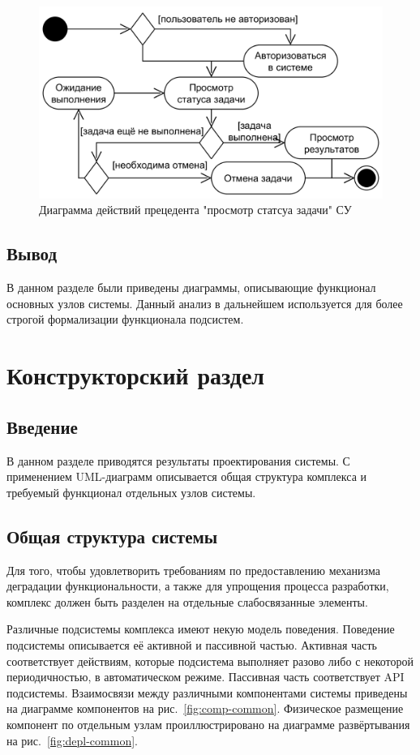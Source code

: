 \documentclass[a4paper,12pt]{report}
\numberwithin{equation}{section}
\begin{document}
\begin{figure}
  \centering
  \includegraphics[width=\linewidth]{diagrams/logic/activity-view}
  \caption{Диаграмма действий прецедента "просмотр статсуа задачи" СУ}
  \label{fig:logic-view}
\end{figure}

\subsection{Вывод}
В данном разделе были приведены диаграммы, описывающие функционал основных узлов системы.
Данный анализ в дальнейшем используется для более строгой формализации функционала подсистем.

\clearpage
\section{Конструкторский раздел}
\subsection{Введение}
В данном разделе приводятся результаты проектирования системы.
С применением UML-диаграмм описывается общая структура комплекса и требуемый функционал отдельных узлов системы.

\subsection{Общая структура системы}
Для того, чтобы удовлетворить требованиям по предоставлению механизма деградации функциональности,
а также для упрощения процесса разработки, комплекс должен быть разделен на отдельные слабосвязанные элементы.

Различные подсистемы комплекса имеют некую модель поведения.
Поведение подсистемы описывается её активной и пассивной частью.
Активная часть соответствует действиям, которые подсистема выполняет разово либо с некоторой периодичностью, в автоматическом режиме.
Пассивная часть соответствует API подсистемы.
Взаимосвязи между различными компонентами системы приведены на диаграмме компонентов на рис.~\ref{fig:comp-common}.
Физическое размещение компонент по отдельным узлам проиллюстрировано на диаграмме развёртывания на рис.~\ref{fig:depl-common}.
\end{document}
